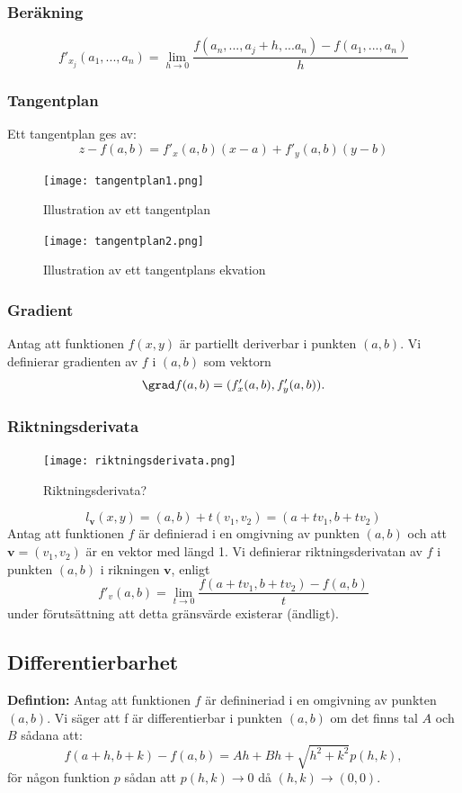 \documentclass[a4paper,12pt]{article}
\begin{document}
\subsubsection*{Beräkning}
\[
    f'_{x_j} (a_1, ..., a_n) = \lim_{h \to 0} \frac{f(a_n, ..., a_j + h, ... a_n) - f(a_1, ..., a_n)}{h}
\]

\subsubsection*{Tangentplan}
Ett tangentplan ges av:
\[
    z - f(a, b) = f'_x(a, b)(x-a) + f'_y(a, b)(y-b)
\]
\begin{figure}[H]
  \centering
  \texttt{[image: tangentplan1.png]}
  \caption{Illustration av ett tangentplan}
\end{figure}

\begin{figure}[H]
  \centering
  \texttt{[image: tangentplan2.png]}
  \caption{Illustration av ett tangentplans ekvation}
\end{figure}

\subsubsection*{Gradient}
Antag att funktionen $f(x, y)$ är partiellt deriverbar i punkten $(a, b)$. Vi definierar gradienten av $f$ i $(a, b)$ som vektorn
\[
    \grad f(a, b) = (f'_x(a, b), f'_y(a, b)).
\]

\subsubsection*{Riktningsderivata}
\begin{figure}[H]
  \centering
  \texttt{[image: riktningsderivata.png]}
  \caption{Riktningsderivata?}
\end{figure}
\[
    l_\textbf{v}(x, y) = (a, b) + t(v_1, v_2) = (a + tv_1, b + tv_2)
\]
Antag att funktionen $f$ är definierad i en omgivning av punkten $(a, b)$ och att $\textbf{v} = (v_1, v_2)$ är en vektor med längd 1. 
Vi definierar riktningsderivatan av $f$ i punkten $(a, b)$ i rikningen $\textbf{v}$, enligt
\[
    f'_v(a, b) = \lim_{t \to 0} \frac{f(a + tv_1, b+tv_2) - f(a, b)}{t}
\]
under förutsättning att detta gränsvärde existerar (ändligt).

\subsection{Differentierbarhet}
\textbf{Defintion:} Antag att funktionen $f$ är definineriad i en omgivning av punkten $(a, b)$. Vi säger att f är differentierbar i punkten $(a, b)$
om det finns tal $A$ och $B$ sådana att:
\[
    f(a + h, b + k) - f(a, b) = Ah + Bh + \sqrt{h^2 + k^2} p(h, k),  
\]
för någon funktion $p$ sådan att $p(h, k) \to 0$ då $(h, k) \to (0, 0)$.
\end{document}

